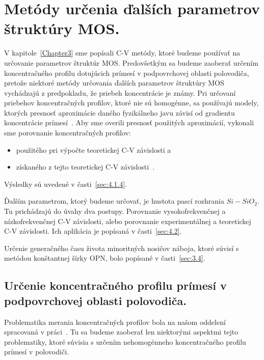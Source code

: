 
\chapter{Metódy určenia ďalších parametrov štruktúry MOS.}\label{Chapter4}

V kapitole~\ref{Chapter3} sme popísali C-V metódy, ktoré budeme
používať na určovanie parametrov štruktúr MOS\@. Predovšetkým sa
budeme zaoberať určením koncentračného profilu dotujúcich prímesí v
podpovrchovej oblasti polovodiča, pretože niektoré metódy určovania
ďalších parametrov štruktúry MOS vychádzajú z predpokladu, že priebeh
koncentrácie je známy. Pri určovaní priebehov koncentračných profilov,
ktoré nie sú homogénne, sa používajú modely, ktorých presnosť
aproximácie daného fyzikálneho javu závisí od gradientu koncentrácie
prímesí~\cite{4.1, 4.2, 4.3, 4.4}. Aby sme overili presnosť použitých
aproximácií, vykonali sme porovnanie koncentračných profilov:

\begin{itemize}
\item použitého pri výpočte teoretickej C-V závislosti a
\item získaného z tejto teoretickej C-V závislosti~\cite{4.5}.
\end{itemize}

Výsledky sú uvedené v časti~\ref{sec:4.1.4}.

\par Ďalším parametrom, ktorý budeme určovať, je hustota pascí
rozhrania $Si-SiO_{2}$. Tu prichádzajú do úvahy dva
postupy. Porovnanie vysokofrekvenčnej a nízkofrekvenčnej C-V
závislosti, alebo porovnanie experimentálnej a teoretickej C-V
závislosti. Ich aplikácia je popísaná v časti~\ref{sec:4.2}.

\par Určenie generačného času života minoritných nosičov náboja, ktoré
súvisí s metódou konštantnej šírky OPN, bolo popísané v
časti~\ref{sec:3.4}.

\section[Určenie koncentračného profilu prímesí]{Určenie koncentračného profilu prímesí v podpovrchovej oblasti polovodiča.}\label{sec:4.1}

Problematika merania koncentračných profilov bola na našom oddelení
spracovaná v práci~\cite{4.6}. Tu sa budeme zaoberať len niektorými
aspektmi tejto problematiky, ktoré súvisia s určením nehomogénneho
koncentračného profilu prímesí v polovodiči.

